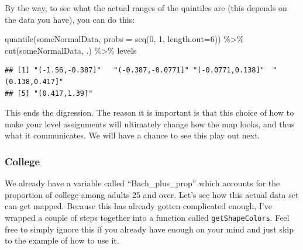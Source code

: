 \documentclass[
  openany]{book}
\newenvironment{Shaded}{\begin{snugshade}}{\end{snugshade}}
\newcommand{\AttributeTok}[1]{\textcolor[rgb]{0.77,0.63,0.00}{#1}}
\newcommand{\DecValTok}[1]{\textcolor[rgb]{0.00,0.00,0.81}{#1}}
\newcommand{\FunctionTok}[1]{\textcolor[rgb]{0.00,0.00,0.00}{#1}}
\newcommand{\NormalTok}[1]{#1}
\newcommand{\SpecialCharTok}[1]{\textcolor[rgb]{0.00,0.00,0.00}{#1}}
\begin{document}
By the way, to see what the actual ranges of the quintiles are (this depends on the data you have), you can do this:

\begin{Shaded}
\begin{Highlighting}[]
\FunctionTok{quantile}\NormalTok{(someNormalData, }\AttributeTok{probs =} \FunctionTok{seq}\NormalTok{(}\DecValTok{0}\NormalTok{, }\DecValTok{1}\NormalTok{, }\AttributeTok{length.out=}\DecValTok{6}\NormalTok{)) }\SpecialCharTok{\%\textgreater{}\%} 
  \FunctionTok{cut}\NormalTok{(someNormalData, .) }\SpecialCharTok{\%\textgreater{}\%}\NormalTok{ levels}
\end{Highlighting}
\end{Shaded}

\begin{verbatim}
## [1] "(-1.56,-0.387]"   "(-0.387,-0.0771]" "(-0.0771,0.138]"  "(0.138,0.417]"   
## [5] "(0.417,1.39]"
\end{verbatim}

This ends the digression. The reason it is important is that this choice of how to make your level assignments will ultimately change how the map looks, and thus what it communicates. We will have a chance to see this play out next.

\hypertarget{college}{%
\subsubsection*{College}\label{college}}

We already have a variable called ``Bach\_plus\_prop'' which accounts for the proportion of college among adults 25 and over. Let's see how this actual data set can get mapped. Because this has already gotten complicated enough, I've wrapped a couple of steps together into a function called \texttt{getShapeColors}. Feel free to simply ignore this if you already have enough on your mind and just skip to the example of how to use it.
\end{document}
